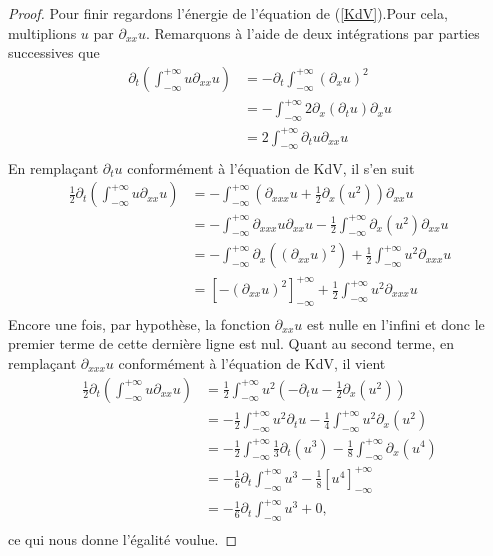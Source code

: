 \documentclass[12pt,a4paper]{article}
\numberwithin{equation}{section}
\begin{document}
\begin{proof}
    Pour finir regardons l'énergie de l'équation de (\ref{KdV}).Pour cela, multiplions $u$ par $\partial_{xx}u$. Remarquons à l'aide de deux intégrations par parties successives que
    \begin{equation*}
        \begin{split}
            \partial_t\left(\int_{-\infty}^{+\infty}u\partial_{xx}u\right) &= -\partial_t\int_{-\infty}^{+\infty}(\partial_xu)^2\\
            &= -\int_{-\infty}^{+\infty}2\partial_x(\partial_tu)\partial_xu\\
            &= 2\int_{-\infty}^{+\infty}\partial_tu\partial_{xx}u\\
        \end{split}
    \end{equation*}
    En remplaçant $\partial_tu$ conformément à l'équation de  KdV, il s'en suit
    \begin{equation*}
        \begin{split}
            \frac{1}{2}\partial_t\left(\int_{-\infty}^{+\infty}u\partial_{xx}u\right) &= -\int_{-\infty}^{+\infty}\left(\partial_{xxx}u + \frac{1}{2}\partial_{x}(u^2)\right)\partial_{xx}u\\
            &= -\int_{-\infty}^{+\infty}\partial_{xxx}u\partial_{xx}u -\frac{1}{2}\int_{-\infty}^{+\infty}\partial_{x}(u^2)\partial_{xx}u\\
            &= -\int_{-\infty}^{+\infty}\partial_x((\partial_{xx}u)^2) + \frac{1}{2}\int_{-\infty}^{+\infty}u^2\partial_{xxx}u\\
            &= \left[-(\partial_{xx}u)^2\right]_{-\infty}^{+\infty} + \frac{1}{2}\int_{-\infty}^{+\infty}u^2\partial_{xxx}u\\
        \end{split}
    \end{equation*}
    Encore une fois, par hypothèse, la fonction $\partial_{xx}u$ est nulle en l'infini et donc le premier terme de cette dernière ligne est nul. Quant au second terme, en remplaçant $\partial_{xxx}u$ conformément à l'équation de KdV, il vient
    \begin{equation*}
        \begin{split}
            \frac{1}{2}\partial_t\left(\int_{-\infty}^{+\infty}u\partial_{xx}u\right) &=\frac{1}{2}\int_{-\infty}^{+\infty}u^2\left( -\partial_tu -\frac{1}{2}\partial_x(u^2)\right)\\
            &= - \frac{1}{2}\int_{-\infty}^{+\infty}u^2 \partial_tu -\frac{1}{4}\int_{-\infty}^{+\infty}u^2\partial_x(u^2)\\
            &= - \frac{1}{2}\int_{-\infty}^{+\infty}\frac{1}{3}\partial_t(u^3) - \frac{1}{8}\int_{-\infty}^{+\infty}\partial_x(u^4)\\
            &= - \frac{1}{6}\partial_t\int_{-\infty}^{+\infty}u^3 - \frac{1}{8}\left[u^4\right]_{-\infty}^{+\infty}\\
            &= - \frac{1}{6}\partial_t\int_{-\infty}^{+\infty}u^3 + 0 ,\\
        \end{split}
    \end{equation*}
    ce qui nous donne l'égalité voulue.
\end{proof}
\end{document}
